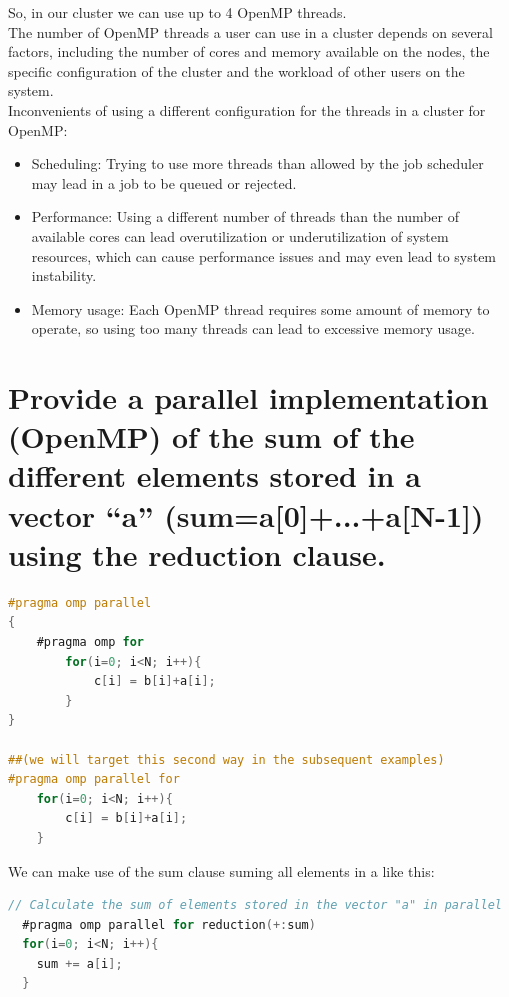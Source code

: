 \documentclass[11pt]{article}
\begin{document}
So, in our cluster we can use up to 4 OpenMP threads.\\

The number of OpenMP threads a user can use in a cluster depends on several factors, including the number of cores and memory available on the nodes, the specific configuration of the cluster and the workload of other users on the system.\\

Inconvenients of using a different configuration for the threads in a cluster for OpenMP:

 \begin{itemize}
  \item Scheduling: Trying to use more threads than allowed by the job scheduler may lead in a job to be queued or rejected.
 \item Performance: Using a different number of threads than the number of available cores can lead overutilization or underutilization of system resources, which can cause performance issues and may even lead to system instability.
 \item Memory usage: Each OpenMP thread requires some amount of memory to operate, so using too many threads can lead to excessive memory usage.
 \end{itemize}

\hypertarget{2}{%
\section{Provide a parallel implementation (OpenMP) of the sum of the different
elements stored in a vector “a” (sum=a[0]+...+a[N-1]) using the reduction clause.}\label{2}}

\begin{lstlisting}[language=C]
 #pragma omp parallel
{
    #pragma omp for
        for(i=0; i<N; i++){
            c[i] = b[i]+a[i];
        }
}

##(we will target this second way in the subsequent examples)
#pragma omp parallel for
    for(i=0; i<N; i++){
        c[i] = b[i]+a[i];
    }
\end{lstlisting}

We can make use of the sum clause suming all elements in a like this:
\begin{lstlisting}[language=C]
  // Calculate the sum of elements stored in the vector "a" in parallel
  #pragma omp parallel for reduction(+:sum)
  for(i=0; i<N; i++){
    sum += a[i];
  }
  \end{lstlisting}
\end{document}
